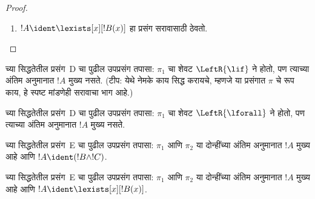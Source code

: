 \documentclass[../../../include/open-logic-section]{subfiles}
\begin{document}
\begin{proof}
\begin{enumerate}
!!{proof}~$\pi_1'$ ची
अंतिम क्रमवर्ती
$\Gamma \Sequent \Delta, !B(c)$
आहे, जेथे $c$ हा
$\RightR{\lforall}$ अनुमानाचा
आयगेन चर आहे. म्हणून $c$ हे
$!B(x)$, $\Gamma$ किंवा~$\Delta$
यांत येत नाही. !!{proof}~$\pi$
नियमित आहे असे मानू; त्यामुळे
$c$ हा फक्त पुढील
$\RightR{\lforall}$ अनुमानाचा
आयगेन चर आहे आणि फक्त त्याच्या
वर येतो. म्हणजे तो फक्त~$\pi_1'$
मध्ये येतो आणि $\pi_1'$ मधील
कोणत्याही अनुमानाचा आयगेन चर
नसतो. $c$ हे $\pi_2$ मध्ये
येत नसल्यामुळे $t$ मध्येही
येत नाही.
नुसार !!{proof}~$\Subst{\pi_1'}{t}{c}$
ही $\Gamma \Sequent \Delta, !B(t)$
ची !!a{proof} आहे. आता पुढील
!!{proof} ला विगमन गृहीतक लावू:
\[
\AxiomC{}
\RightLabel{$\Subst{\pi_1'}{t}{c}$}
\Deduce$\Gamma \fCenter \Delta, !B(t)$
\AxiomC{}
\RightLabel{$\pi_2''$}
\Deduce$!B(t), \Gamma \fCenter \Delta$
\RightLabel{\CutCS}
\BinaryInf$\Gamma \fCenter \Delta$
\DisplayProof
\]
(कटचे !!{formula}~$!B(t)$
असल्यामुळे विगमन गृहीतक
लागू होते; या !!{proof} ची
कट-कोटी $\pi$ पेक्षा कमी आहे.)
\item $!A \ident \lexists[x][!B(x)]$
हा प्रसंग सरावासाठी ठेवतो.
\end{enumerate}
\end{proof}

\begin{prob}
 च्या
सिद्धतेतील प्रसंग~D चा
पुढील उपप्रसंग तपासा:
$\pi_1$ चा शेवट
$\LeftR{\lif}$ ने होतो,
पण त्याच्या अंतिम अनुमानात
$!A$ मुख्य नसते.
(टीप: येथे नेमके काय सिद्ध
करायचे, म्हणजे या प्रसंगात
$\pi$ चे रूप काय, हे स्पष्ट
मांडणेही सरावाचा भाग आहे.)
\end{prob}

\begin{prob}
 च्या
सिद्धतेतील प्रसंग~D चा
पुढील उपप्रसंग तपासा:
$\pi_1$ चा शेवट
$\LeftR{\lforall}$ ने होतो,
पण त्याच्या अंतिम अनुमानात
$!A$ मुख्य नसते.
\end{prob}

\begin{prob}
 च्या
सिद्धतेतील प्रसंग~E चा
पुढील उपप्रसंग तपासा:
$\pi_1$ आणि $\pi_2$
या दोन्हींच्या अंतिम अनुमानात
$!A$ मुख्य आहे आणि
$!A \ident (!B \land !C)$.
\end{prob}

\begin{prob}
 च्या
सिद्धतेतील प्रसंग~E चा
पुढील उपप्रसंग तपासा:
$\pi_1$ आणि $\pi_2$
या दोन्हींच्या अंतिम अनुमानात
$!A$ मुख्य आहे आणि
$!A \ident \lexists[x][!B(x)]$.
\end{prob}
\end{document}
